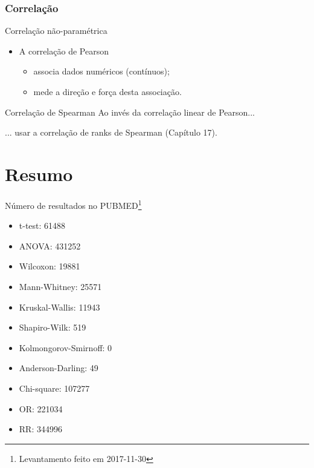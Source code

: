 \documentclass{beamer}
\begin{document}
\subsubsection{Correlação}

\begin{frame}{Correlação não-paramétrica}
  \begin{itemize}
    \small
  \item A correlação de Pearson
    \begin{itemize}
      \scriptsize
    \item associa dados numéricos (contínuos);
    \item mede a direção e força desta associação.
    \end{itemize}
  \end{itemize}
  \bigskip
  \begin{block}{Correlação de Spearman}
    \small
    Ao invés da correlação linear de Pearson...

    \bigskip
    ... usar a correlação de ranks de Spearman (Capítulo 17).
  \end{block}
\end{frame}

\section{Resumo}

\begin{frame}{Número de resultados no PUBMED\footnote{\scriptsize Levantamento feito em 2017-11-30}}
  \begin{itemize}
    \footnotesize
  \item t-test: 61488
  \item ANOVA: 431252
  \item Wilcoxon: 19881
  \item Mann-Whitney: 25571
  \item Kruskal-Wallis: 11943
  \item Shapiro-Wilk: 519
  \item Kolmongorov-Smirnoff: 0
  \item Anderson-Darling: 49
  \item Chi-square: 107277
  \item OR: 221034
  \item RR: 344996
  \end{itemize}
\end{frame}
\end{document}
